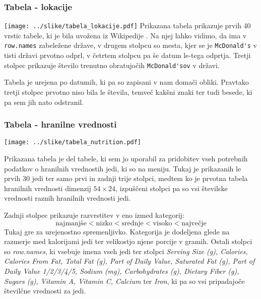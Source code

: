 \documentclass[hidelinks, 11pt,a4paper]{article}
\begin{document}
\newpage
\subsubsection{Tabela - lokacije}
\vspace{5mm}
\texttt{[image: ../slike/tabela\_lokacije.pdf]}
\noindent
Prikazana tabela prikazuje prvih 40 vrstic tabele, ki je bila uvožena iz Wikipedije \cite{bib:drzave}. Na njej lahko vidimo, da ima v \verb|row.names| zabeležene države, v drugem stolpcu so mesta, kjer se je \verb|McDonald's| v tisti državi prvotno odprl, v četrtem stolpcu pa še datum le-tega odprtja. Tretji stolpec prikazuje število trenutno obratujočih \verb|McDonald'sov| v državi. \par

Tabela je urejena po datumih, ki pa so zapisani v nam domači obliki. Pravtako tretji stolpec prvotno niso bila le števila, temveč kakšni znaki ter tudi besede, ki pa sem jih nato odstranil.

\subsubsection{Tabela - hranilne vrednosti}
\vspace{5mm}
\texttt{[image: ../slike/tabela\_nutrition.pdf]}

\noindent
Prikazana tabela je del tabele, ki sem jo uporabil za pridobitev vseh potrebnih podatkov o hranilnih vrednostih jedi, ki so na meniju. Tukaj je prikazanih le prvih 30 jedi ter samo prvi in zadnji trije stolpci, medtem ko je prvotna tabela hranilnih vrednosti dimenzij $54\times24$, izpuščeni stolpci pa so vsi številske vrednosti raznih hranilnih vrednosti jedi. \par

Zadnji stolpec prikazuje razvrstitev v eno izmed kategorij: $$\mbox{najmanjše} < \mbox{nizko} < \mbox{srednje} < \mbox{visoko} < \mbox{največje}$$
Tukaj gre za urejenostno spremenljivko. Kategorija je dodeljena glede na razmerje med kalorijami jedi ter velikostjo njene porcije v gramih.
Ostali stolpci so \textit{row.names}, ki vsebuje imena vseh jedi ter stolpci \textit{Serving Size (g), Calories, Calories From Fat, Total Fat (g), Part of Daily Value, Saturated Fat (g), Part of Daily Value 1/2/3/4/5, Sodium (mg), Carbohydrates (g), Dietary Fiber (g), Sugars (g), Vitamin A, Vitamin C, Calcium} ter \textit{Iron}, ki pa so vsi pripadajoče številčne vrednosti za jedi.
\end{document}
